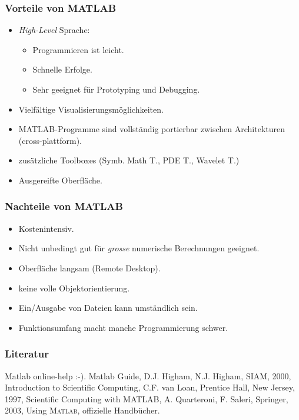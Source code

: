 \documentclass[hyperref={xetex}]{beamer}
\begin{document}
\begin{frame}[fragile]\frametitle{Vorteile von MATLAB}

\begin{itemize}
\item \emph{High-Level} Sprache:
\begin{itemize}
\item Programmieren ist leicht.
\item Schnelle Erfolge.
\item Sehr geeignet für Prototyping und Debugging.
\end{itemize}
\item Vielfältige Visualisierungsmöglichkeiten.
\item MATLAB-Programme sind vollständig portierbar zwischen Architekturen (cross-plattform).
\item zusätzliche Toolboxes (Symb. Math T., PDE T., Wavelet T.)  
\item Ausgereifte Oberfläche.
\end{itemize}
\end{frame}

\begin{frame}[fragile]\frametitle{Nachteile von MATLAB}
    \begin{itemize}
        \item Kostenintensiv.
        \item Nicht unbedingt gut für \emph{grosse} numerische Berechnungen geeignet.
        \item Oberfläche langsam (Remote Desktop).
        \item keine volle Objektorientierung.
        \item Ein/Ausgabe von Dateien kann umständlich sein.
        \item Funktionsumfang macht manche Programmierung schwer.
    \end{itemize}
\end{frame}



\begin{frame}[fragile]\frametitle{Literatur}
\begin{thebibliography}{10}
\small
{} {\Large \alert{Matlab online-help :-)}}.
\alert{Matlab Guide}, D.J. Higham, N.J. Higham, SIAM, 2000, 
 \alert{Introduction to Scientific Computing}, C.F. van Loan, Prentice Hall,
New Jersey, 1997,
 \alert{Scientific Computing with MATLAB}, A. Quarteroni, F. Saleri, Springer, 2003,
 \alert {Using \textsc{Matlab}}, offizielle Handbücher.
\end{thebibliography}
\end{frame}
\end{document}
